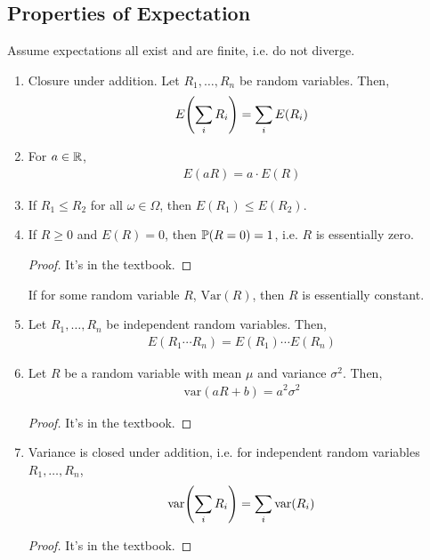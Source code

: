 \subsection{Properties of Expectation}
\begin{aside}
    Assume expectations all exist and are finite, i.e. do not diverge.
\end{aside}
\begin{enumerate}
    \item Closure under addition. Let $R_1, \ldots, R_n$ be random variables. Then,
    \begin{align}
        E\qty(\sum_i R_i) = \sum_i E(R_i)
    \end{align}
    \item For $a \in \mathbb{R}$,
    \begin{align}
        E(aR) = a \cdot E(R)
    \end{align}
    \item If $R_1 \le R_2$ for all $\omega \in \Omega$, then $E(R_1) \le E(R_2)$.
    \item If $R \ge 0$ and $E(R) = 0$, then $\mathbb{P}(R = 0) = 1$, i.e. $R$ is essentially zero.
    \begin{proof}
        It's in the textbook.
    \end{proof}
    \begin{aside}
        If for some random variable $R$, $\text{Var}(R)$, then $R$ is essentially constant.
    \end{aside}
    \item Let $R_1, \ldots, R_n$ be independent random variables. Then,
    \begin{align}
        E(R_1\cdots R_n) = E(R_1) \cdots E(R_n)
    \end{align}
    \item Let $R$ be a random variable with mean $\mu$ and variance $\sigma^2$. Then,
    \begin{align}
        \text{var}(aR + b) = a^2\sigma^2
    \end{align}
    \begin{proof}
        It's in the textbook.
    \end{proof}
    \item Variance is closed under addition, i.e. for independent random variables $R_1, \ldots, R_n$,
    \begin{align}
        \text{var}\qty(\sum_i R_i) = \sum_i \text{var}\qty(R_i)
    \end{align}
    \begin{proof}
        It's in the textbook.
    \end{proof}
\end{enumerate}

